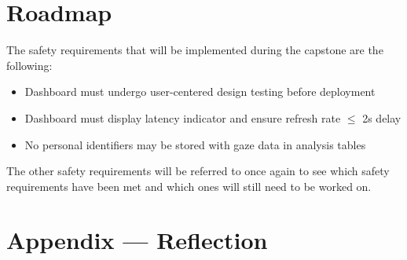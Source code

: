 \documentclass{article}
\begin{document}
\section{Roadmap}
The safety requirements that will be implemented during the capstone are the following: 
\begin{itemize}
    \item Dashboard must undergo user-centered design testing before deployment
    \item Dashboard must display latency indicator and ensure refresh rate $\leq$ 2s delay
    \item No personal identifiers may be stored with gaze data in analysis tables
\end{itemize}
The other safety requirements will be referred to once again to see which safety requirements have been met and which ones will still need to be worked on. 

\newpage
\section*{Appendix --- Reflection}
\end{document}
